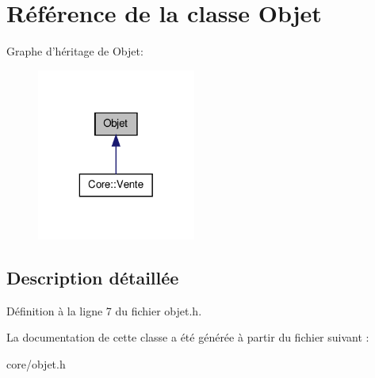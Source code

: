 \hypertarget{class_objet}{
\section{Référence de la classe Objet}
\label{db/d1e/class_objet}
}


Graphe d'héritage de Objet:\nopagebreak
\begin{figure}[H]
\begin{center}
\leavevmode
\includegraphics[width=148pt]{de/d98/class_objet__inherit__graph}
\end{center}
\end{figure}


\subsection{Description détaillée}


Définition à la ligne 7 du fichier objet.h.



La documentation de cette classe a été générée à partir du fichier suivant :\begin{DoxyCompactItemize}
\item 
core/objet.h\end{DoxyCompactItemize}
